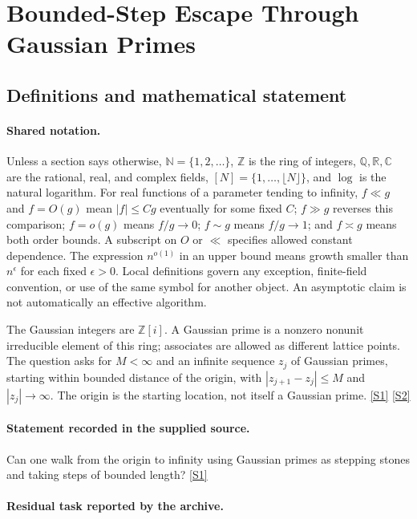 \documentclass[11pt,a4paper]{article}
\newcommand{\N}{\mathbb{N}}
\newcommand{\Z}{\mathbb{Z}}
\newcommand{\Q}{\mathbb{Q}}
\newcommand{\R}{\mathbb{R}}
\newcommand{\C}{\mathbb{C}}
\newcommand{\sref}[2]{\hyperlink{source:#1:#2}{[S#2]}}
\begin{document}
\section{Bounded-Step Escape Through Gaussian Primes}\label{statement}


\subsection{Definitions and mathematical statement}

\paragraph{Shared notation.}Unless a section says otherwise, $\N=\{1,2,\ldots\}$,
$\Z$ is the ring of integers, $\Q,\R,\C$ are the rational, real, and complex
fields, $[N]=\{1,\ldots,\lfloor N\rfloor\}$, and $\log$ is the natural
logarithm. For real functions of a parameter tending to infinity,
$f\ll g$ and $f=O(g)$ mean $|f|\leq Cg$ eventually for some fixed $C$;
$f\gg g$ reverses this comparison; $f=o(g)$ means $f/g\to0$;
$f\sim g$ means $f/g\to1$; and $f\asymp g$ means both order bounds.
A subscript on $O$ or $\ll$ specifies allowed constant dependence.
The expression $n^{o(1)}$ in an upper bound means growth smaller than
$n^\epsilon$ for each fixed $\epsilon>0$. Local definitions govern any
exception, finite-field convention, or use of the same symbol for another
object. An asymptotic claim is not automatically an effective algorithm.



The Gaussian integers are $\Z[i]$. A Gaussian prime is a nonzero nonunit irreducible element of this ring; associates are allowed as different lattice points. The question asks for $M<\infty$ and an infinite sequence $z_j$ of Gaussian primes, starting within bounded distance of the origin, with $|z_{j+1}-z_j|\leq M$ and $|z_j|\to\infty$. The origin is the starting location, not itself a Gaussian prime. \sref{statement}{1} \sref{statement}{2}

\paragraph{Statement recorded in the supplied source.}
Can one walk from the origin to infinity using Gaussian primes as stepping stones and taking steps of bounded length? \sref{statement}{1}

\paragraph{Residual task reported by the archive.}
\end{document}
